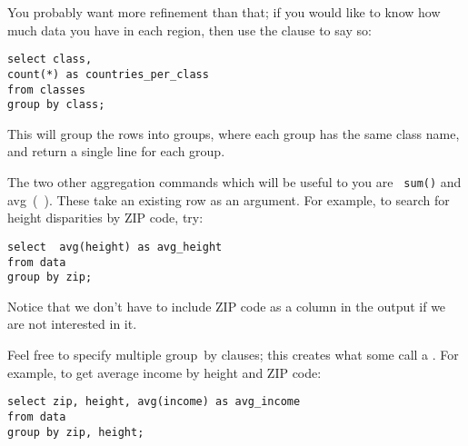 

You probably want more refinement than that; if you would like to
know how much data you have in each region, then use the  clause to say so:
\begin{lstlisting}
select class, 
count(*) as countries_per_class
from classes
group by class;
\end{lstlisting}
This will group the rows into groups, where each group has the same
class name, and return a single line for each group.


The two other aggregation commands which will be useful to you are {\tt
sum()} and \si{avg()}. These take an existing row as an argument.
For example, to search for height disparities by ZIP code, try:
\begin{lstlisting}
select  avg(height) as avg_height
from data
group by zip;
\end{lstlisting}
Notice that we don't have to include ZIP code as a column in the output
if we are not interested in it.


Feel free to specify multiple \si{group by} clauses; this creates what
some call a . For example, to get average income by
height and ZIP code: 
\begin{lstlisting}
select zip, height, avg(income) as avg_income
from data
group by zip, height;
\end{lstlisting}

